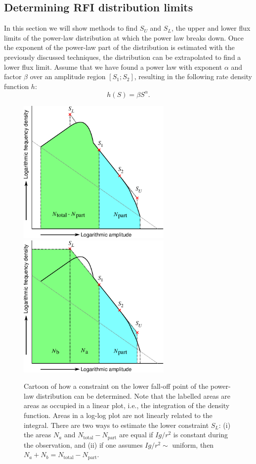\documentclass[useAMS,usenatbib]{mn2e}
\begin{document}
\subsection{Determining RFI distribution limits} \label{sec:rfi-distribution-constraints}
In this section we will show methods to find $S_U$ and $S_L$, the upper and lower flux limits of the power-law distribution at which the power law breaks down. Once the exponent of the power-law part of the distribution is estimated with the previously discussed techniques, the distribution can be extrapolated to find a lower flux limit. Assume that we have found a power law with exponent $\alpha$ and factor $\beta$ over an amplitude region $[S_1 ; S_2]$, resulting in the following rate density function $h$:
\begin{equation} \label{eq:amplitude-power-law}
h(S) = \beta S^\alpha.
\end{equation}
\begin{figure}
\begin{center}
\includegraphics[width=7.5cm]{img/explanation-lower-constraint/FindingCounts}
\includegraphics[width=7.5cm]{img/explanation-lower-constraint/FindingConstraints}
\caption{Cartoon of how a constraint on the lower fall-off point of the power-law distribution can be determined. Note that the labelled areas are areas as occupied in a linear plot, i.e., the integration of the density function. Areas in a log-log plot are not linearly related to the integral. There are two ways to estimate the lower constraint $S_L$: (i) the areas $N_a$ and $N_\textrm{total}-N_\textrm{part}$ are equal if $Ig/r^2$ is constant during the observation, and (ii) if one assumes $Ig/r^2\sim$ uniform, then $N_a+N_b = N_\textrm{total}-N_\textrm{part}$.}
\label{fig:explanation-constraints}
\end{center}
\end{figure}
\end{document}
